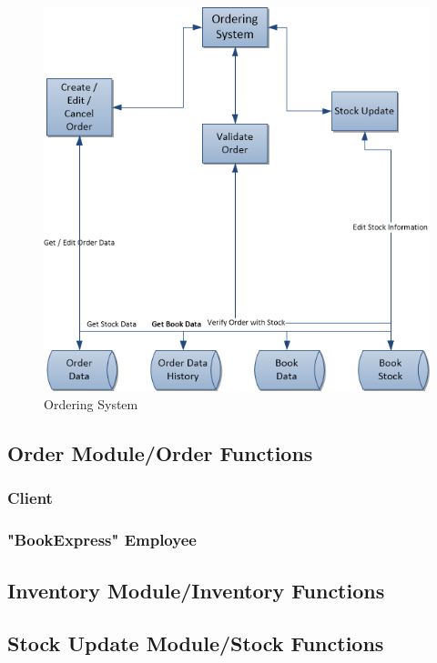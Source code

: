 \documentclass[11pt,a4paper,oneside,svgnames]{report}
\begin{document}
\begin{figure}[H]
 \begin{center}
  \includegraphics[width=\textwidth]{OrderingSystem.png}
 \end{center}
 \caption{Ordering System}
\end{figure}

\subsection{Order Module/Order Functions}
\subsubsection{Client}
\subsubsection{"BookExpress" Employee}

\subsection{Inventory Module/Inventory Functions}

\subsection{Stock Update Module/Stock Functions}
\end{document}
